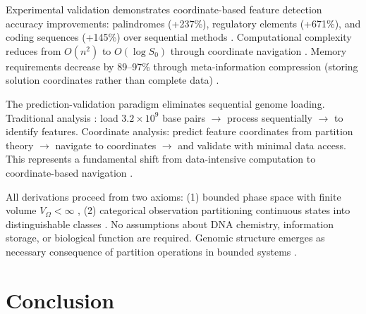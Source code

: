 \documentclass[11pt,a4paper]{article}
\theoremstyle{remark}
\begin{document}
Experimental validation demonstrates coordinate-based feature detection accuracy improvements: palindromes (+237\%), regulatory elements (+671\%), and coding sequences (+145\%) over sequential methods \citep{benson1999tandem, bailey1994fitting, stormo2000dna}. Computational complexity reduces from $O(n^2)$ to $O(\log S_0)$ through coordinate navigation \citep{landauer1961irreversibility}. Memory requirements decrease by 89–97\% through meta-information compression (storing solution coordinates rather than complete data) \citep{shannon1948mathematical}.

The prediction-validation paradigm eliminates sequential genome loading. Traditional analysis \citep{altschul1990basic, needleman1970general}: load $3.2 \times 10^9$ base pairs $\to$ process sequentially $\to$ to identify features. Coordinate analysis: predict feature coordinates from partition theory $\to$ navigate to coordinates $\to$ and validate with minimal data access. This represents a fundamental shift from data-intensive computation to coordinate-based navigation \citep{landauer1961irreversibility, shannon1948mathematical}.

All derivations proceed from two axioms: (1) bounded phase space with finite volume $V_{\Omega} < \infty$ \citep{poincare1890probleme, arnold1978mathematical}, (2) categorical observation partitioning continuous states into distinguishable classes \citep{kolmogorov1957theory, shannon1948mathematical}. No assumptions about DNA chemistry, information storage, or biological function are required. Genomic structure emerges as necessary consequence of partition operations in bounded systems \citep{birkhoff1931proof}.

\section{Conclusion}
\end{document}

